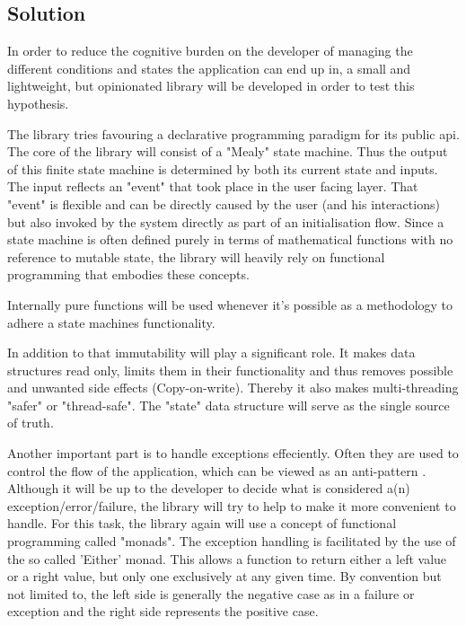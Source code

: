 \subsection{Solution}
\label{subsec:solution}




In order to reduce the cognitive burden on the developer of managing the different conditions and 
states the application can end up in, a small and lightweight, but opinionated library will be developed
in order to test this hypothesis.

The library tries favouring a declarative programming paradigm for its public api.
The core of the library will consist of a "Mealy" state machine. 
Thus the output of this finite state machine is determined by both its current state and inputs.
The input reflects an "event" that took place in the user facing layer.
That "event" is flexible and can be directly caused by the user (and his interactions) but also invoked
by the system directly as part of an initialisation flow. %
Since a state machine is often defined purely in terms of mathematical functions with no reference to mutable state, 
the library will heavily rely on functional programming that embodies these concepts.

Internally pure functions will be used whenever it's possible as a methodology to adhere a state machines functionality.

In addition to that immutability will play a significant role. It makes data structures read only, limits them in their functionality 
and thus removes possible and unwanted side effects (Copy-on-write). Thereby it also makes multi-threading "safer" or "thread-safe".
The "state" data structure will serve as the single source of truth.

Another important part is to handle exceptions effeciently. Often they are used to control the flow of
the application, which can be viewed as an anti-pattern \cite{dontUseExceptionsForFlowControl}.
Although it will be up to the developer to decide what is considered a(n) exception/error/failure, 
the library will try to help to make it more convenient to handle.
For this task, the library again will use a concept of functional programming called "monads".
The exception handling is facilitated by the use of the so called 'Either' monad.
This allows a function to return either a left value or a right value, but only one exclusively at
any given time. By convention but not limited to, the left side is generally the negative case as in a failure or exception
and the right side represents the positive case.

